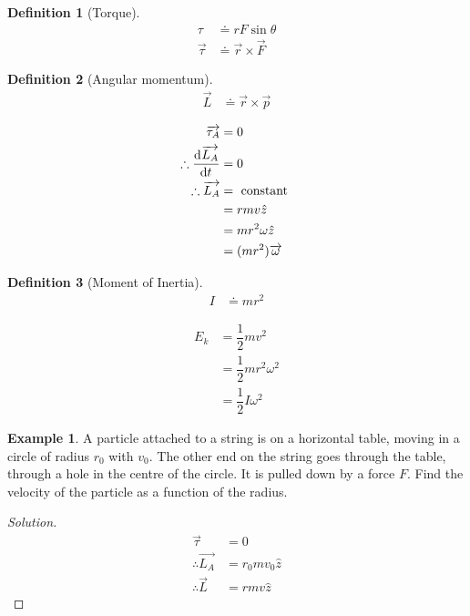 \documentclass[fleqn, a4paper, 12pt]{article}
\theoremstyle{definition}
\newtheorem{example}{Example}
\newtheorem{definition}{Definition}
\theoremstyle{theorem}
\newenvironment{solution}
{\begin{proof}[Solution]\let\qed\relax}
	{\end{proof}}
\begin{document}
\begin{definition}[Torque]
	\begin{align*}
		\tau &\doteq r F \sin \theta\\
		\overrightarrow{\tau} &\doteq \overrightarrow{r} \times \overrightarrow{F}
	\end{align*}
\end{definition}

\begin{definition}[Angular momentum]
	\begin{align*}
		\overrightarrow{L} &\doteq \overrightarrow{r} \times \overrightarrow{p}
	\end{align*}
\end{definition}

\begin{align*}
	\overrightarrow{\tau_A} &= 0\\
	\therefore \dod{\overrightarrow{L_A}}{t} &= 0\\
	\therefore \overrightarrow{L_A} &= \text{ constant }\\
	&= r m v \hat{z}\\
	&= m r^2 \omega \hat{z}\\
	&= (m r^2) \overrightarrow{\omega}
\end{align*}

\begin{definition}[Moment of Inertia]
	\begin{align*}
		I &\doteq m r^2
	\end{align*}
\end{definition}

\begin{align*}
	E_k &= \dfrac{1}{2} m v^2\\
	&= \dfrac{1}{2} m r^2 \omega^2\\
	&= \dfrac{1}{2} I \omega^2
\end{align*}

\begin{example}
	A particle attached to a string is on a horizontal table, moving in a circle of radius $r_0$ with $v_0$. The other end on the string goes through the table, through a hole in the centre of the circle. It is pulled down by a force $F$. Find the velocity of the particle as a function of the radius.
\end{example}

\begin{solution}
	\begin{align*}
		\overrightarrow{\tau} &= 0\\
		\therefore \overrightarrow{L_A} &= r_0 m v_0 \hat{z}\\
		\therefore \overrightarrow{L} &= r m v \hat{z}
	\end{align*}
\end{solution}
\end{document}
